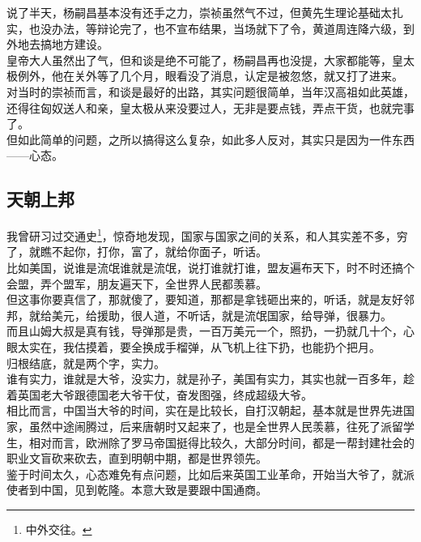 \begin{multicols}{\theparacolNo}
说了半天，杨嗣昌基本没有还手之力，崇祯虽然气不过，但黄先生理论基础太扎实，也没办法，等辩论完了，也不宣布结果，当场就下了令，黄道周连降六级，到外地去搞地方建设。\\

皇帝大人虽然出了气，但和谈是绝不可能了，杨嗣昌再也没提，大家都能等，皇太极例外，他在关外等了几个月，眼看没了消息，认定是被忽悠，就又打了进来。\\

对当时的崇祯而言，和谈是最好的出路，其实问题很简单，当年汉高祖如此英雄，还得往匈奴送人和亲，皇太极从来没要过人，无非是要点钱，弄点干货，也就完事了。\\

但如此简单的问题，之所以搞得这么复杂，如此多人反对，其实只是因为一件东西——心态。\\

\subsection{天朝上邦}
我曾研习过交通史\footnote{中外交往。}，惊奇地发现，国家与国家之间的关系，和人其实差不多，穷了，就瞧不起你，打你，富了，就给你面子，听话。\\

比如美国，说谁是流氓谁就是流氓，说打谁就打谁，盟友遍布天下，时不时还搞个会盟，弄个盟军，朋友遍天下，全世界人民都羡慕。\\

但这事你要真信了，那就傻了，要知道，那都是拿钱砸出来的，听话，就是友好邻邦，就给美元，给援助，很人道，不听话，就是流氓国家，给导弹，很暴力。\\

而且山姆大叔是真有钱，导弹那是贵，一百万美元一个，照扔，一扔就几十个，心眼太实在，我估摸着，要全换成手榴弹，从飞机上往下扔，也能扔个把月。\\

归根结底，就是两个字，实力。\\

谁有实力，谁就是大爷，没实力，就是孙子，美国有实力，其实也就一百多年，趁着英国老大爷跟德国老大爷干仗，奋发图强，终成超级大爷。\\

相比而言，中国当大爷的时间，实在是比较长，自打汉朝起，基本就是世界先进国家，虽然中途闹腾过，后来唐朝时又起来了，也是全世界人民羡慕，往死了派留学生，相对而言，欧洲除了罗马帝国挺得比较久，大部分时间，都是一帮封建社会的职业文盲砍来砍去，直到明朝中期，都是世界领先。\\

鉴于时间太久，心态难免有点问题，比如后来英国工业革命，开始当大爷了，就派使者到中国，见到乾隆。本意大致是要跟中国通商。\\


\end{multicols}

